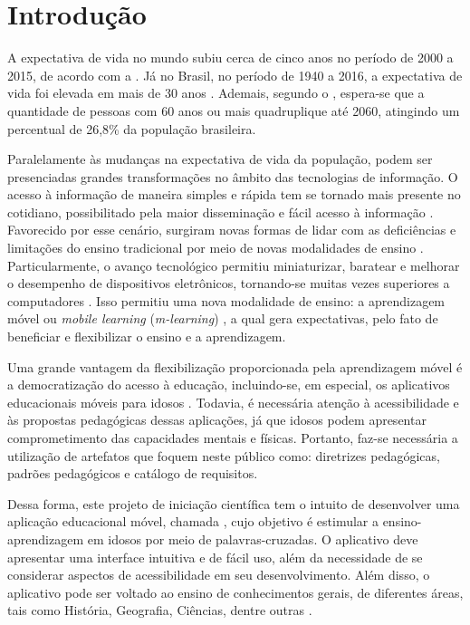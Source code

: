 \chapter{Introdução}
\label{sec:introd}
A expectativa de vida no mundo subiu cerca de cinco anos no período de 2000 a 2015, de acordo com a \cite{world2016world}. Já no Brasil, no período de 1940 a 2016, a expectativa de vida foi elevada em mais de 30 anos \citep{expectativabrasileiros}. Ademais, segundo o \cite{demografico2010disponivel}, espera-se que a quantidade de pessoas com 60 anos ou mais quadruplique até 2060, atingindo um percentual de 26,8\% da população brasileira.

Paralelamente às mudanças na expectativa de vida da população, podem ser presenciadas grandes transformações no âmbito das tecnologias de informação. O acesso à informação de maneira simples e rápida tem se tornado mais presente no cotidiano, possibilitado pela maior disseminação e fácil acesso à informação \citep{Grossi2014}. Favorecido por esse cenário, surgiram novas formas de lidar com as deficiências e limitações do ensino tradicional por meio de novas modalidades de ensino \citep{Behrens2005}. Particularmente, o avanço tecnológico permitiu miniaturizar, baratear e melhorar o desempenho de dispositivos eletrônicos, tornando-se muitas vezes superiores a computadores \citep{Zamfirache2013}. Isso permitiu uma nova modalidade de ensino: a aprendizagem móvel ou \textit{mobile learning} (\textit{m-learning}) \citep{Crompton2013, Keegan2005, Traxler2006, Wu2012}, a qual gera expectativas, pelo fato de beneficiar e flexibilizar o ensino e a aprendizagem.

Uma grande vantagem da flexibilização proporcionada pela aprendizagem móvel é a democratização do acesso à educação, incluindo-se, em especial, os aplicativos educacionais móveis para idosos \citep{Oliveira2019_quali}. Todavia, é necessária atenção à acessibilidade e às propostas pedagógicas dessas aplicações, já que idosos podem apresentar comprometimento das capacidades mentais e físicas. Portanto, faz-se necessária a utilização de artefatos que foquem neste público como: diretrizes pedagógicas, padrões pedagógicos e catálogo de requisitos.

Dessa forma, este projeto de iniciação científica tem o intuito de desenvolver uma aplicação educacional móvel, chamada \crossword, cujo objetivo é estimular a ensino-aprendizagem em idosos por meio de palavras-cruzadas. O aplicativo deve apresentar uma interface intuitiva e de fácil uso, além da necessidade de se considerar aspectos de acessibilidade em seu desenvolvimento. %
Além disso, o aplicativo pode ser voltado ao ensino de conhecimentos gerais, de diferentes áreas, tais como História, Geografia, Ciências, dentre outras \citep{oliveira2018crossword}. 

